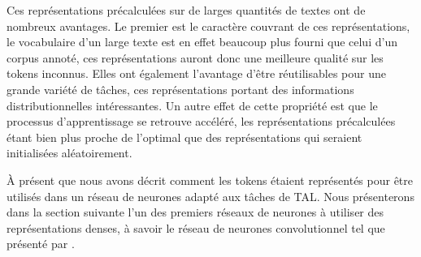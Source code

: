 \documentclass[citation\_needed]{subfiles}
\begin{document}
Ces représentations précalculées sur de larges quantités de textes ont de nombreux avantages. Le premier est le caractère couvrant de ces représentations, le vocabulaire d'un large texte est en effet beaucoup plus fourni que celui d'un corpus annoté, ces représentations auront donc une meilleure qualité sur les tokens inconnus. Elles ont également l'avantage d'être réutilisables pour une grande variété de tâches, ces représentations portant des informations distributionnelles intéressantes. Un autre effet de cette propriété est que le processus d'apprentissage se retrouve accéléré, les représentations précalculées étant bien plus proche de l'optimal que des représentations qui seraient initialisées aléatoirement.

À présent que nous avons décrit comment les tokens étaient représentés pour être utilisés dans un réseau de neurones adapté aux tâches de TAL. Nous présenterons dans la section suivante l'un des premiers réseaux de neurones à utiliser des représentations denses, à savoir le réseau de neurones convolutionnel tel que présenté par \citet{collobert2008unified}.
\end{document}
